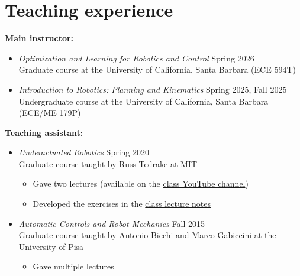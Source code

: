 \documentclass[11pt,a4paper,sans,twoside]{moderncv}
\begin{document}
\section{Teaching experience}

\textbf{Main instructor:}

\begin{itemize}
\item \textit{Optimization and Learning for Robotics and Control} \hfill Spring 2026 \\
Graduate course at the University of California, Santa Barbara (ECE 594T)
\item \textit{Introduction to Robotics: Planning and Kinematics} \hfill Spring 2025, Fall 2025 \\
Undergraduate course at the University of California, Santa Barbara (ECE/ME 179P)
\end{itemize}

\textbf{Teaching assistant:}

\begin{itemize}

\item \textit{Underactuated  Robotics} \hfill Spring 2020 \\
Graduate course taught by Russ Tedrake at MIT
\begin{itemize}
\item
Gave two lectures (available on the  \href{https://www.youtube.com/playlist?list=PLkx8KyIQkMfX1WpWYqtep7TOmboZeDtev}{\color{cyan}class YouTube channel})
\item
Developed the exercises in the \href{http://underactuated.csail.mit.edu}{\color{cyan}class lecture notes}
\end{itemize}

\item \textit{Automatic Controls and Robot Mechanics} \hfill Fall 2015 \\
Graduate course taught by Antonio Bicchi and Marco Gabiccini at the University of Pisa
\begin{itemize}
\item
Gave multiple lectures
\end{itemize}

\end{itemize}

%
%
%
%
\end{document}
